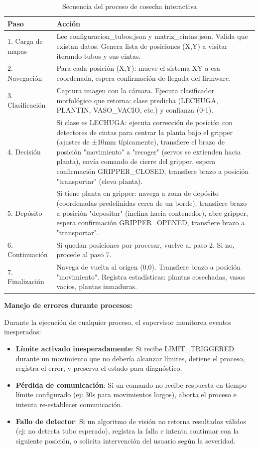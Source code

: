 \begin{table}[H]
\centering
\small
\begin{tabular}{|l|p{10cm}|}
\hline
\textbf{Paso} & \textbf{Acción} \\
\hline
1. Carga de mapas & Lee configuracion\_tubos.json y matriz\_cintas.json. Valida que existan datos. Genera lista de posiciones (X,Y) a visitar iterando tubos y sus cintas. \\
\hline
2. Navegación & Para cada posición (X,Y): mueve el sistema XY a esa coordenada, espera confirmación de llegada del firmware. \\
\hline
3. Clasificación & Captura imagen con la cámara. Ejecuta clasificador morfológico que retorna: clase predicha (LECHUGA, PLANTIN, VASO\_VACIO, etc.) y confianza (0-1). \\
\hline
4. Decisión & Si clase es LECHUGA: ejecuta corrección de posición con detectores de cintas para centrar la planta bajo el gripper (ajustes de ±10mm típicamente), transfiere el brazo de posición "movimiento" a "recoger" (servos se extienden hacia planta), envía comando de cierre del gripper, espera confirmación GRIPPER\_CLOSED, transfiere brazo a posición "transportar" (eleva planta). \\
\hline
5. Depósito & Si tiene planta en gripper: navega a zona de depósito (coordenadas predefinidas cerca de un borde), transfiere brazo a posición "depositar" (inclina hacia contenedor), abre gripper, espera confirmación GRIPPER\_OPENED, transfiere brazo a "transportar". \\
\hline
6. Continuación & Si quedan posiciones por procesar, vuelve al paso 2. Si no, procede al paso 7. \\
\hline
7. Finalización & Navega de vuelta al origen (0,0). Transfiere brazo a posición "movimiento". Registra estadísticas: plantas cosechadas, vasos vacíos, plantas inmaduras. \\
\hline
\end{tabular}
\caption{Secuencia del proceso de cosecha interactiva}
\label{tab:proceso_cosecha}
\end{table}

\textbf{Manejo de errores durante procesos:}

Durante la ejecución de cualquier proceso, el supervisor monitorea eventos inesperados:

\begin{itemize}[label=$\bullet$]
    \item \textbf{Límite activado inesperadamente}: Si recibe LIMIT\_TRIGGERED durante un movimiento que no debería alcanzar límites, detiene el proceso, registra el error, y preserva el estado para diagnóstico.
    \item \textbf{Pérdida de comunicación}: Si un comando no recibe respuesta en tiempo límite configurado (ej: 30s para movimientos largos), aborta el proceso e intenta re-establecer comunicación.
    \item \textbf{Fallo de detector}: Si un algoritmo de visión no retorna resultados válidos (ej: no detecta tubo esperado), registra la falla e intenta continuar con la siguiente posición, o solicita intervención del usuario según la severidad.
\end{itemize}

